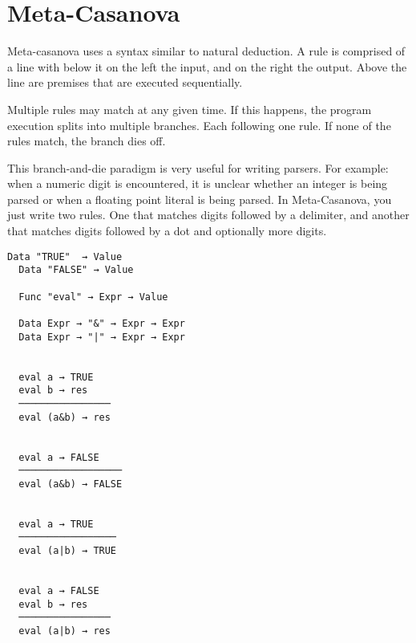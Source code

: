 \section{Meta-Casanova}
\begin{multicols}{2}
  Meta-casanova uses a syntax similar to natural deduction.
  A rule is comprised of a line with below it on the left the input, and on the right the output.
  Above the line are premises that are executed sequentially.

  Multiple rules may match at any given time.
  If this happens, the program execution splits into multiple branches.
  Each following one rule.
  If none of the rules match, the branch dies off. 
  
  This branch-and-die paradigm is very useful for writing parsers.
  For example: when a numeric digit is encountered, it is unclear whether an integer is being parsed or when a floating point literal is being parsed. 
  In Meta-Casanova, you just write two rules. One that matches digits followed by a delimiter, and another that matches digits followed by a dot and optionally more digits.
\columnbreak
\begin{lstlisting}[caption=A Boolean expression interpreter in Meta-Casanova.]
  Data "TRUE"  → Value
  Data "FALSE" → Value

  Func "eval" → Expr → Value

  Data Expr → "&" → Expr → Expr
  Data Expr → "|" → Expr → Expr


  eval a → TRUE
  eval b → res
  ────────────────
  eval (a&b) → res
  

  eval a → FALSE
  ──────────────────
  eval (a&b) → FALSE
 

  eval a → TRUE
  ─────────────────
  eval (a|b) → TRUE


  eval a → FALSE
  eval b → res
  ────────────────
  eval (a|b) → res
\end{lstlisting}

\end{multicols}
